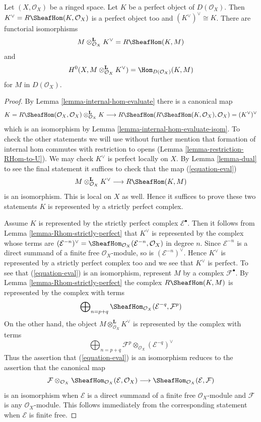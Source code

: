 \begin{lemma}
\label{lemma-dual-perfect-complex}
Let $(X, \mathcal{O}_X)$ be a ringed space. Let $K$ be a perfect object of
$D(\mathcal{O}_X)$. Then $K^\vee = R\SheafHom(K, \mathcal{O}_X)$ is a
perfect object too and $(K^\vee)^\vee \cong K$. There are
functorial isomorphisms
$$
M \otimes^\mathbf{L}_{\mathcal{O}_X} K^\vee = R\SheafHom(K, M)
$$
and
$$
H^0(X, M \otimes^\mathbf{L}_{\mathcal{O}_X} K^\vee) =
\Hom_{D(\mathcal{O}_X)}(K, M)
$$
for $M$ in $D(\mathcal{O}_X)$.
\end{lemma}

\begin{proof}
By Lemma \ref{lemma-internal-hom-evaluate} there is a canonical map
$$
K = R\SheafHom(\mathcal{O}_X, \mathcal{O}_X)
\otimes_{\mathcal{O}_X}^\mathbf{L} K \longrightarrow
R\SheafHom(R\SheafHom(K, \mathcal{O}_X), \mathcal{O}_X) =
(K^\vee)^\vee
$$
which is an isomorphism by Lemma \ref{lemma-internal-hom-evaluate-isom}.
To check the other statements we will use without further mention that
formation of internal hom commutes with restriction to opens
(Lemma \ref{lemma-restriction-RHom-to-U}).
We may check $K^\vee$ is perfect locally on $X$.
By Lemma \ref{lemma-dual}
to see the final statement it suffices to check that the map
(\ref{equation-eval})
$$
M \otimes^\mathbf{L}_{\mathcal{O}_X} K^\vee
\longrightarrow
R\SheafHom(K, M)
$$
is an isomorphism. This is local on $X$ as well.
Hence it suffices to prove these two statements $K$ is represented
by a strictly perfect complex.

\medskip\noindent
Assume $K$ is represented by the strictly perfect complex
$\mathcal{E}^\bullet$. Then it follows from
Lemma \ref{lemma-Rhom-strictly-perfect}
that $K^\vee$ is represented by the complex whose terms are
$(\mathcal{E}^{-n})^\vee =
\SheafHom_{\mathcal{O}_X}(\mathcal{E}^{-n}, \mathcal{O}_X)$
in degree $n$. Since $\mathcal{E}^{-n}$ is a direct summand of a finite
free $\mathcal{O}_X$-module, so is $(\mathcal{E}^{-n})^\vee$.
Hence $K^\vee$ is represented by a strictly perfect complex too
and we see that $K^\vee$ is perfect.
To see that (\ref{equation-eval}) is an isomorphism, represent
$M$ by a complex $\mathcal{F}^\bullet$.
By Lemma \ref{lemma-Rhom-strictly-perfect} the complex
$R\SheafHom(K, M)$ is represented by the complex with terms
$$
\bigoplus\nolimits_{n = p + q}
\SheafHom_{\mathcal{O}_X}(\mathcal{E}^{-q}, \mathcal{F}^p)
$$
On the other hand, the object $M \otimes^\mathbf{L}_{\mathcal{O}_X} K^\vee$
is represented by the complex with terms
$$
\bigoplus\nolimits_{n = p + q}
\mathcal{F}^p \otimes_{\mathcal{O}_X} (\mathcal{E}^{-q})^\vee
$$
Thus the assertion that (\ref{equation-eval}) is an isomorphism
reduces to the assertion that the canonical map
$$
\mathcal{F}
\otimes_{\mathcal{O}_X}
\SheafHom_{\mathcal{O}_X}(\mathcal{E}, \mathcal{O}_X)
\longrightarrow
\SheafHom_{\mathcal{O}_X}(\mathcal{E}, \mathcal{F})
$$
is an isomorphism when $\mathcal{E}$ is a direct summand of a finite
free $\mathcal{O}_X$-module and $\mathcal{F}$ is any $\mathcal{O}_X$-module.
This follows immediately from the corresponding statement when
$\mathcal{E}$ is finite free.
\end{proof}
